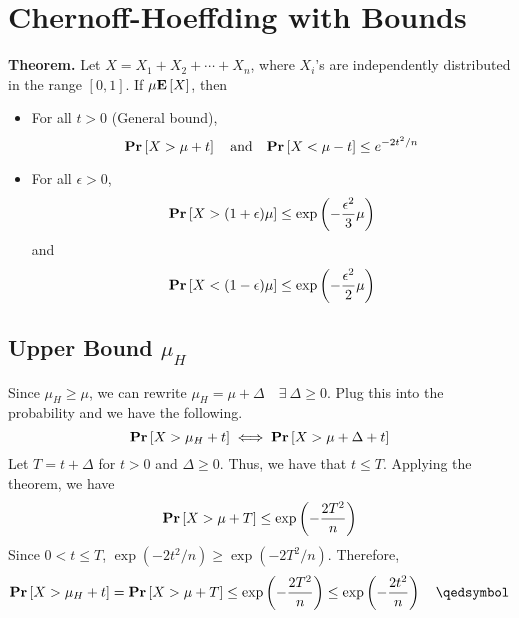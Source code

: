 \chapter{Chernoff-Hoeffding with Bounds}

\begin{tcolorbox}
	\textbf{Theorem.} Let $X = X_1 + X_2 + \cdots + X_n$, where $X_i$'s are independently distributed in the range $[0, 1]$. If $\mu\mathbf{E}\left[X\right]$, then
\begin{itemize}
	\item For all $t > 0$ (General bound), 
		\begin{equation}\label{eqn:general-chernoff}
			\mathbf{Pr}\left[X > \mu + t\right]\quad\text{and}\quad \mathbf{Pr}\left[X < \mu - t\right] \leq e^{-2t^2/n}
		\end{equation}
	\item For all $\epsilon > 0$, 
		\begin{equation}\label{eqn:small-chernoff-upper}
			\mathbf{Pr}\left[X > (1 + \epsilon)\mu\right] \leq \exp\left(- \frac{\epsilon^2}{3}\mu\right)
		\end{equation}
		and 
		\begin{equation}\label{eqn:small-chernoff-lower}
			\mathbf{Pr}\left[X < (1 - \epsilon)\mu\right] \leq \exp\left(-\frac{\epsilon^2}{2}\mu\right)
		\end{equation}
\end{itemize}
\end{tcolorbox}

\section{Upper Bound $\mu_H$}

Since $\mu_H \geq \mu$, we can rewrite $\mu_H = \mu + \Delta\quad\exists\ \Delta \geq 0$. Plug this into the probability and we have the following.
\[ \mathbf{Pr}\left[X > \mu_H + t\right] \iff \mathbf{Pr}\left[X > \mu + \Delta + t\right] \]
Let $T = t + \Delta$ for $t > 0$ and $\Delta \geq 0$. Thus, we have that $t \leq T$. Applying the theorem, we have
\[ \mathbf{Pr}\left[X > \mu + T\right] \leq \exp\left(- \frac{2T^2}{n}\right) \]
Since $0 < t \leq T$, $\exp(-2t^2 / n) \geq \exp(-2T^2 / n)$. Therefore,
\[ \pr{X > \mu_H + t} = \pr{X > \mu + T} \leq \exp\left(- \frac{2T^2}{n}\right) \leq \exp\left(-\frac{2t^2}{n}\right) \quad \qedsymbol \]

